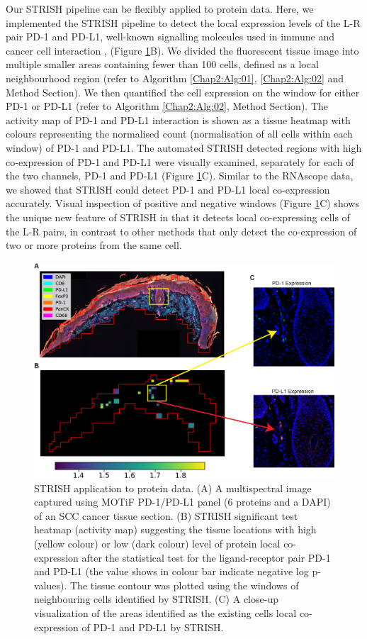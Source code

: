 Our STRISH pipeline can be flexibly applied to protein data. Here, we implemented the STRISH pipeline to detect the local expression levels of the L-R pair PD-1 and PD-L1, well-known signalling molecules used in immune and cancer cell interaction \cite{pardoll2012blockade}, (Figure \ref{fig:Chap2_figure3}B). We divided the fluorescent tissue image into multiple smaller areas containing fewer than 100 cells, defined as a local neighbourhood region (refer to Algorithm \ref{Chap2:Alg:01}, \ref{Chap2:Alg:02} and Method Section). We then quantified the cell expression on the window for either PD-1 or PD-L1 (refer to Algorithm \ref{Chap2:Alg:02}, Method Section). The activity map of PD-1 and PD-L1 interaction is shown as a tissue heatmap with colours representing the normalised count (normalisation of all cells within each window) of PD-1 and PD-L1. The automated STRISH detected regions with high co-expression of PD-1 and PD-L1 were visually examined, separately for each of the two channels, PD-1 and PD-L1 (Figure \ref{fig:Chap2_figure3}C). Similar to the RNAscope data, we showed that STRISH could detect PD-1 and PD-L1 local co-expression accurately. Visual inspection of positive and negative windows (Figure \ref{fig:Chap2_figure3}C) shows the unique new feature of STRISH in that it detects local co-expressing cells of the L-R pairs, in contrast to other methods that only detect the co-expression of two or more proteins from the same cell. 
\begin{figure}[htp]
    \centering
    \includegraphics[width=0.8\columnwidth]{Chapter2/Figures/Chapter2_Fig3.jpg}
    \caption[STRISH application to protein data. ]{STRISH application to protein data. (A) A multispectral image captured using MOTiF PD-1/PD-L1 panel (6 proteins and a DAPI) of an SCC cancer tissue section. (B) STRISH significant test heatmap (activity map) suggesting the tissue locations with high (yellow colour) or low (dark colour) level of protein local co-expression after the statistical test for the ligand-receptor pair PD-1 and PD-L1 (the value shows in colour bar indicate negative log p-values). The tissue contour was plotted using the windows of neighbouring cells identified by STRISH. (C) A close-up visualization of the areas identified as the existing cells local co-expression of PD-1 and PD-L1 by STRISH.}
    \label{fig:Chap2_figure3}
\end{figure}
